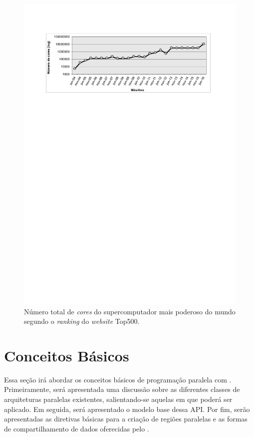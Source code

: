 \documentclass{SBCbookchapter}
\begin{document}
	\begin{figure}[t]
		\centering
		\includegraphics[width=\linewidth]{img/cores-top500.pdf}
		\caption{Número total de \textit{cores} do supercomputador mais
		poderoso do mundo segundo o \textit{ranking} do \textit{website} Top500.}
		\label{fig:top500}
	\end{figure}


\section{Conceitos Básicos}
\label{sec:conceitos basicos}

	Essa seção irá abordar os conceitos básicos de programação paralela
	com \openmp. Primeiramente, será apresentada uma discussão sobre as
	diferentes classes de arquiteturas paralelas existentes,
	salientando-se aquelas em que \openmp poderá ser aplicado. Em
	seguida, será apresentado o modelo base dessa API.  Por fim, serão
	apresentadas as diretivas básicas para a criação de regiões
	paralelas e as formas de compartilhamento de dados oferecidas pelo
	\openmp.
\end{document}
